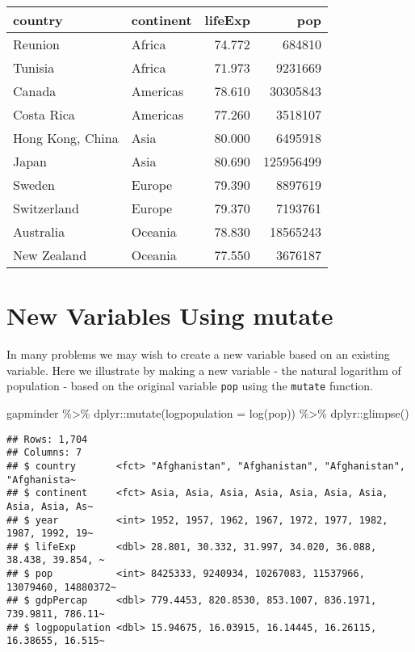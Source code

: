 \documentclass[
]{book}
\newenvironment{Shaded}{\begin{snugshade}}{\end{snugshade}}
\newcommand{\AttributeTok}[1]{\textcolor[rgb]{0.77,0.63,0.00}{#1}}
\newcommand{\FunctionTok}[1]{\textcolor[rgb]{0.00,0.00,0.00}{#1}}
\newcommand{\NormalTok}[1]{#1}
\newcommand{\SpecialCharTok}[1]{\textcolor[rgb]{0.00,0.00,0.00}{#1}}
\begin{document}
\begin{tabular}{l|l|r|r}
\hline
country & continent & lifeExp & pop\\
\hline
Reunion & Africa & 74.772 & 684810\\
\hline
Tunisia & Africa & 71.973 & 9231669\\
\hline
Canada & Americas & 78.610 & 30305843\\
\hline
Costa Rica & Americas & 77.260 & 3518107\\
\hline
Hong Kong, China & Asia & 80.000 & 6495918\\
\hline
Japan & Asia & 80.690 & 125956499\\
\hline
Sweden & Europe & 79.390 & 8897619\\
\hline
Switzerland & Europe & 79.370 & 7193761\\
\hline
Australia & Oceania & 78.830 & 18565243\\
\hline
New Zealand & Oceania & 77.550 & 3676187\\
\hline
\end{tabular}

\hypertarget{new-variables-using-mutate}{%
\section{New Variables Using mutate}\label{new-variables-using-mutate}}

In many problems we may wish to create a new variable based on an existing variable. Here we illustrate by making a new variable - the natural logarithm of population - based on the original variable \texttt{pop} using the \texttt{mutate} function.

\begin{Shaded}
\begin{Highlighting}[]
\NormalTok{gapminder }\SpecialCharTok{\%\textgreater{}\%}
\NormalTok{  dplyr}\SpecialCharTok{::}\FunctionTok{mutate}\NormalTok{(}\AttributeTok{logpopulation =} \FunctionTok{log}\NormalTok{(pop)) }\SpecialCharTok{\%\textgreater{}\%}
\NormalTok{  dplyr}\SpecialCharTok{::}\FunctionTok{glimpse}\NormalTok{()}
\end{Highlighting}
\end{Shaded}

\begin{verbatim}
## Rows: 1,704
## Columns: 7
## $ country       <fct> "Afghanistan", "Afghanistan", "Afghanistan", "Afghanista~
## $ continent     <fct> Asia, Asia, Asia, Asia, Asia, Asia, Asia, Asia, Asia, As~
## $ year          <int> 1952, 1957, 1962, 1967, 1972, 1977, 1982, 1987, 1992, 19~
## $ lifeExp       <dbl> 28.801, 30.332, 31.997, 34.020, 36.088, 38.438, 39.854, ~
## $ pop           <int> 8425333, 9240934, 10267083, 11537966, 13079460, 14880372~
## $ gdpPercap     <dbl> 779.4453, 820.8530, 853.1007, 836.1971, 739.9811, 786.11~
## $ logpopulation <dbl> 15.94675, 16.03915, 16.14445, 16.26115, 16.38655, 16.515~
\end{verbatim}
\end{document}
